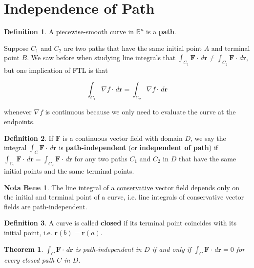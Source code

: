 \documentclass[11pt,oneside,english]{amsart}
\newtheorem{theorem}{Theorem}
\theoremstyle{definition}
\newtheorem*{example}{Example}
\newtheorem*{definition}{Definition}
\newtheorem*{note}{Nota Bene}
\newcommand{\R}{\mathbb{R}}
\begin{document}
%



\section*{Independence of Path}

\begin{definition}
A piecewise-smooth curve in $\R^n$ is a \textbf{path}.
\end{definition}


Suppose $C_1$ and $C_2$ are two paths that have the same initial point $A$ and terminal point $B$. We saw before when studying line integrals that $\int_{C_1}\mathbf{F}\cdot \,d\mathbf{r}\neq\int_{C_2}\mathbf{F}\cdot\,d\mathbf{r}$, but one implication of FTL is that

\[
\int_{C_1}\nabla f\cdot\,d\mathbf{r}=\int_{C_2}\nabla f\cdot\,d\mathbf{r}
\]

 whenever $\nabla f$ is continuous because we only need to evaluate the curve at the endpoints.


\begin{definition}
If $\mathbf{F}$ is a continuous vector field with domain $D$, we say the integral $\displaystyle \int_C\mathbf{F}\cdot\,d\mathbf{r}$ is \textbf{path-independent} (or \textbf{independent of path}) if $\int_{C_1}\mathbf{F}\cdot \,d\mathbf{r}=\int_{C_2}\mathbf{F}\cdot\,d\mathbf{r}$ for any two paths $C_1$ and $C_2$ in $D$ that have the same initial points and the same terminal points.
\end{definition}


 \begin{note}
 The line integral of a \uline{conservative} vector field depends only on the initial and terminal point of a curve, i.e. line integrals of conservative vector fields are path-independent.
 \end{note}
 
 \begin{definition}
 A curve is called \textbf{closed} if its terminal point coincides with its initial point, i.e. $\mathbf{r}(b)=\mathbf{r}(a)$.
 \end{definition}
 
 \begin{theorem}
 $\displaystyle \int_C\mathbf{F}\cdot\,d\mathbf{r}$ is path-independent in $D$ if and only if $\int_C\mathbf{F}\cdot\,d\mathbf{r}=0$ for every closed path $C$ in $D$.
 \end{theorem}
 
\end{document}
